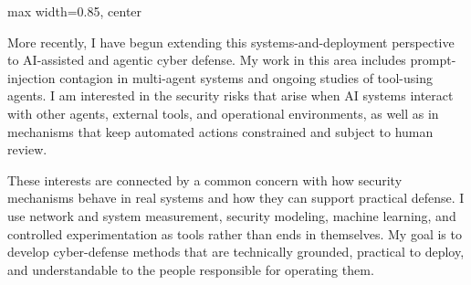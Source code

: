 \documentclass[10pt]{article}
\begin{document}
\begin{adjustbox}{max width=0.85\linewidth, center}
\end{adjustbox}
\par\vspace{0.5em}

\vspace{0.12em}
More recently, I have begun extending this systems-and-deployment perspective to AI-assisted and agentic cyber defense. My work in this area includes prompt-injection contagion in multi-agent systems and ongoing studies of tool-using agents. I am interested in the security risks that arise when AI systems interact with other agents, external tools, and operational environments, as well as in mechanisms that keep automated actions constrained and subject to human review.

\vspace{0.12em}
These interests are connected by a common concern with how security mechanisms behave in real systems and how they can support practical defense. I use network and system measurement, security modeling, machine learning, and controlled experimentation as tools rather than ends in themselves. My goal is to develop cyber-defense methods that are technically grounded, practical to deploy, and understandable to the people responsible for operating them.
\end{document}
